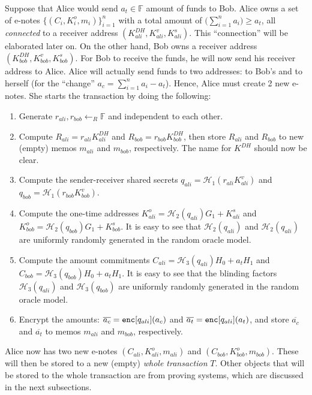 \documentclass{article}
\begin{document}
Suppose that Alice would send $a_t\in\mathbb{F}$ amount of funds to Bob. Alice owns a set of e-notes $\{(C_i,K_i^o,m_i)\}_{i=1}^n$ with a total amount of $\big(\sum_{i=1}^{n}{a_i}\big)\ge a_t$, all \textit{connected} to a receiver address $(K_{ali}^{DH}, K_{ali}^v, K_{ali}^s)$. This ``connection'' will be elaborated later on. On the other hand, Bob owns a receiver address $(K_{bob}^{DH}, K_{bob}^v, K_{bob}^s)$. For Bob to receive the funds, he will now send his receiver address to Alice. Alice will actually send funds to two addresses: to Bob's and to herself (for the ``change'' $a_c = \sum_{i=1}^{n}{a_i} - a_t$). Hence, Alice must create 2 new e-notes. She starts the transaction by doing the following:
\begin{enumerate}
    \item Generate $r_{ali}, r_{bob}\leftarrow_R\mathbb{F}$ and independent to each other.
    \item Compute $R_{ali} = r_{ali}K_{ali}^{DH}$ and $R_{bob} = r_{bob}K_{bob}^{DH}$, then store $R_{ali}$ and $R_{bob}$ to new (empty) memos $m_{ali}$ and $m_{bob}$, respectively. The name for $K^{DH}$ should now be clear.
    \item Compute the sender-receiver shared secrets $q_{ali} = \mathcal{H}_1(r_{ali}K_{ali}^{v})$ and $q_{bob} = \mathcal{H}_1(r_{bob}K_{bob}^{v})$.
    \item Compute the one-time addresses $K_{ali}^{o} = \mathcal{H}_2(q_{ali})G_1 + K_{ali}^s$ and $K_{bob}^{o} = \mathcal{H}_2(q_{bob})G_1 + K_{bob}^s$. It is easy to see that $\mathcal{H}_2(q_{ali})$ and $\mathcal{H}_2(q_{ali})$ are uniformly randomly generated in the random oracle model.
    \item Compute the amount commitments $C_{ali} = \mathcal{H}_3(q_{ali})H_0 + a_t H_1$ and $C_{bob} = \mathcal{H}_3(q_{bob})H_0 + a_t H_1$. It is easy to see that the blinding factors $\mathcal{H}_3(q_{ali})$ and $\mathcal{H}_3(q_{bob})$ are uniformly randomly generated in the random oracle model.
    \item Encrypt the amounts: $\overline{a_c} = {\tt enc}[q_{ali}](a_c)$ and $\overline{a_t} = {\tt enc}[q_{ali}](a_t)$, and store $\overline{a_c}$ and $\overline{a_t}$ to memos $m_{ali}$ and $m_{bob}$, respectively.
\end{enumerate}
Alice now has two new e-notes $(C_{ali}, K_{ali}^o, m_{ali})$ and $(C_{bob}, K_{bob}^o, m_{bob})$. These will then be stored to a new (empty) \textit{whole transaction} $T$. Other objects that will be stored to the whole transaction are from proving systems, which are discussed in the next subsections.
\end{document}

